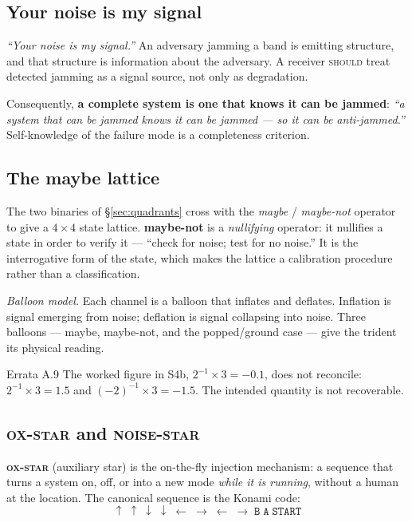 \documentclass[11pt,a4paper]{article}
\newcommand{\SHOULD}{\textsc{should}}
\begin{document}
\subsection{Your noise is my signal}

\begin{ruleblock}
\emph{``Your noise is my signal.''} An adversary jamming a band is emitting
structure, and that structure is information about the adversary. A receiver
\SHOULD{} treat detected jamming as a signal source, not only as degradation.
\end{ruleblock}

Consequently, \textbf{a complete system is one that knows it can be jammed}:
\emph{``a system that can be jammed knows it can be jammed --- so it can be
anti-jammed.''} Self-knowledge of the failure mode is a completeness criterion.

\subsection{The maybe lattice}

The two binaries of \S\ref{sec:quadrants} cross with the
\emph{maybe} / \emph{maybe-not} operator to give a $4 \times 4$ state lattice.
\textbf{maybe-not} is a \emph{nullifying} operator: it nullifies a state in
order to verify it --- ``check for noise; test for no noise.'' It is the
interrogative form of the state, which makes the lattice a calibration procedure
rather than a classification.

\emph{Balloon model.} Each channel is a balloon that inflates and deflates.
Inflation is signal emerging from noise; deflation is signal collapsing into
noise. Three balloons --- maybe, maybe-not, and the popped/ground case --- give
the trident its physical reading.

\begin{errata}{Errata A.9}
The worked figure in S4b, $2^{-1} \times 3 = -0.1$, does not reconcile:
$2^{-1}\times 3 = 1.5$ and $(-2)^{-1}\times 3 = -1.5$. The intended quantity is
not recoverable.
\end{errata}

\subsection{\textsc{ox-star} and \textsc{noise-star}}
\label{sec:oxstar}

\textbf{\textsc{ox-star}} (auxiliary star) is the on-the-fly injection
mechanism: a sequence that turns a system on, off, or into a new mode
\emph{while it is running}, without a human at the location. The canonical
sequence is the Konami code:
\[
\uparrow\;\uparrow\;\downarrow\;\downarrow\;\leftarrow\;\rightarrow\;\leftarrow\;\rightarrow\;\texttt{B}\;\texttt{A}\;\texttt{START}
\]
\end{document}
